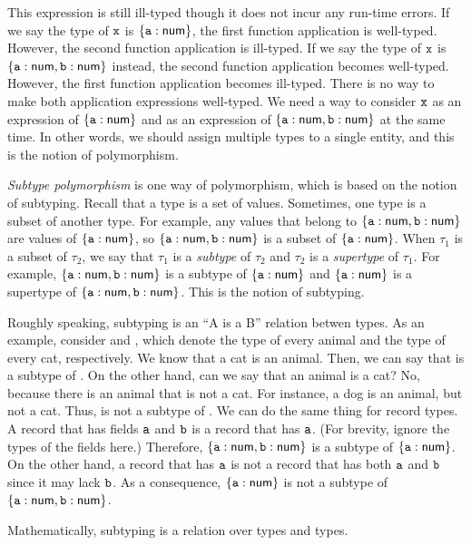 This expression is still ill-typed though it does not incur any run-time errors.
If we say the type of $\texttt{x}$ is ${\{\texttt{a}:\textsf{num}\}}$, the first function application
is well-typed. However, the second function application is ill-typed. If we say
the type of $\texttt{x}$ is $\{\texttt{a}:\textsf{num},\texttt{b}:\textsf{num}\}$ instead, the second function application
becomes well-typed. However, the first function application becomes ill-typed. There is no
way to make both application expressions well-typed. We need a way to consider
$\texttt{x}$ as an expression of ${\{\texttt{a}:\textsf{num}\}}$ and as an expression of
$\{\texttt{a}:\textsf{num},\texttt{b}:\textsf{num}\}$ at the same time. In other words, we should assign
multiple types to a single entity, and this is the notion of polymorphism.

\textit{Subtype polymorphism} is one way of
polymorphism, which is based on the notion of subtyping. Recall that a
type is a set of values. Sometimes, one type is a subset of another type. For
example, any values that belong to $\{\texttt{a}:\textsf{num},\texttt{b}:\textsf{num}\}$ are values of
${\{\texttt{a}:\textsf{num}\}}$, so $\{\texttt{a}:\textsf{num},\texttt{b}:\textsf{num}\}$ is a subset of
${\{\texttt{a}:\textsf{num}\}}$. When $\tau_1$ is a subset of $\tau_2$,
we say that $\tau_1$ is a \textit{subtype} of $\tau_2$ and
$\tau_2$ is a \textit{supertype} of $\tau_1$.
For example, $\{\texttt{a}:\textsf{num},\texttt{b}:\textsf{num}\}$ is a subtype of ${\{\texttt{a}:\textsf{num}\}}$ and
$\{\texttt{a}:\textsf{num}\}$ is a supertype of ${\{\texttt{a}:\textsf{num},\texttt{b}:\textsf{num}\}}$.
This is the notion of subtyping.

Roughly speaking, subtyping is an ``A is a B'' relation betwen types. As an example,
consider  and , which denote the type of every animal
and the type of every cat, respectively. We know that a cat is an animal. Then,
we can say that  is a subtype of . On the other hand, can
we say that an animal is a cat? No, because there is an animal that is not a
cat. For instance, a dog is an animal, but not a cat. Thus,  is not
a subtype of . We can do the same thing for record types. A record
that has fields $\texttt{a}$ and $\texttt{b}$ is a record that has $\texttt{a}$. (For brevity,
ignore the types of the fields here.) Therefore, $\{\texttt{a}:\textsf{num},\texttt{b}:\textsf{num}\}$ is a
subtype of ${\{\texttt{a}:\textsf{num}\}}$. On the other hand, a record that has $\texttt{a}$ is not
a record that has both $\texttt{a}$ and $\texttt{b}$ since it may lack $\texttt{b}$. As a consequence,
${\{\texttt{a}:\textsf{num}\}}$ is not a subtype of $\{\texttt{a}:\textsf{num},\texttt{b}:\textsf{num}\}$.

Mathematically, subtyping is a relation over types and types.

